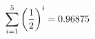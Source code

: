 \documentclass[preview]{standalone}
\begin{document}
\begin{align*}
\sum_{i=1}^{ 5 } \left({ 1 } \over {2} \right)^i = { 0.96875 }
\end{align*}
\end{document}
